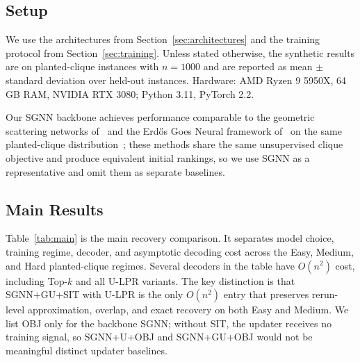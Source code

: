 \documentclass[mathematics,article,submit,pdftex,moreauthors]{Definitions/mdpi}
\begin{document}
\subsection{Setup}

We use the architectures from Section~\ref{sec:architectures} and the training
protocol from Section~\ref{sec:training}. Unless stated otherwise, the synthetic
results are on planted-clique instances with $n=1000$ and are reported as mean
$\pm$ standard deviation over held-out instances. Hardware: AMD Ryzen 9 5950X,
64\,GB RAM, NVIDIA RTX 3080; Python 3.11, PyTorch 2.2.

Our SGNN backbone achieves performance comparable to the geometric scattering
networks of~\citet{min2022} and the Erd\H{o}s Goes Neural framework
of~\citet{karalias2020} on the same planted-clique distribution~\citep{ShohamHRV26};
these methods share the same unsupervised clique objective and produce equivalent
initial rankings, so we use SGNN as a representative and omit them as separate
baselines.

\subsection{Main Results}
\label{sec:main_results}

Table~\ref{tab:main} is the main recovery comparison. It separates model choice,
training regime, decoder, and asymptotic decoding cost across the Easy, Medium,
and Hard planted-clique regimes. Several decoders in the table have $O(n^2)$
cost, including Top-$k$ and all U-LPR variants. The key distinction is that
\textsc{SGNN+GU}+SIT with U-LPR is the only $O(n^2)$ entry that preserves
rerun-level approximation, overlap, and exact recovery on both Easy and Medium.
We list OBJ only for the backbone \textsc{SGNN}; without SIT, the updater receives
no training signal, so \textsc{SGNN+U}+OBJ and \textsc{SGNN+GU}+OBJ would not be
meaningful distinct updater baselines.
\end{document}
